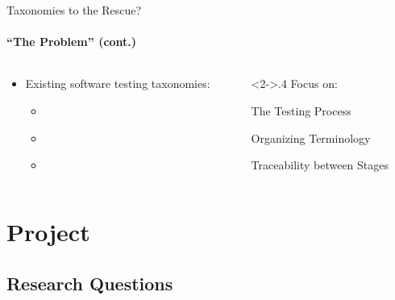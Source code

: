 \documentclass{beamer}
\begin{document}
\begin{frame}{Taxonomies to the Rescue?}
    \framesubtitle{``The Problem'' (cont.)}
    \begin{columns}[T]
        \begin{column}{.6\textwidth}
            \begin{itemize}
                \item Existing software testing taxonomies:
                      \begin{itemize}
                          \item \citet{TebesEtAl2020a}
                          \item \citet{SouzaEtAl2017}
                          \item \citet{UnterkalmsteinerEtAl2014}
                      \end{itemize}
            \end{itemize}
        \end{column}
        \begin{column}<2->{.4\textwidth}
            \centering
            \vspace{1.5mm}
            Focus on:
            \vspace{0.5mm}

            \small The Testing Process

            Organizing Terminology

            Traceability between Stages
        \end{column}
    \end{columns}
\end{frame}


\section{Project}
\subsection{Research Questions}

\def\rqa{\begin{alertblock}{Research Question 1}
        \rqatext{}
    \end{alertblock}
}

\def\rqb{\begin{alertblock}{Research Question 2}
        \rqbtext{}
    \end{alertblock}
}
\end{document}
